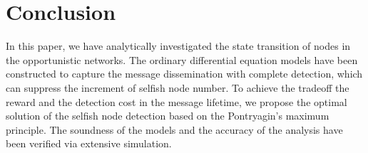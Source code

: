 \section{Conclusion}
\label{sec:conclude}
In this paper, we have analytically investigated 
the state transition of nodes in the opportunistic networks. 
The ordinary differential equation models have been constructed to
capture the message dissemination with complete detection,
which can suppress the increment of selfish node number.
To achieve the tradeoff the reward and the detection cost
in the message lifetime,
we propose the optimal solution of the selfish node detection
based on the Pontryagin's maximum principle. 
The soundness of the models and the accuracy of the analysis
have been verified via extensive simulation.